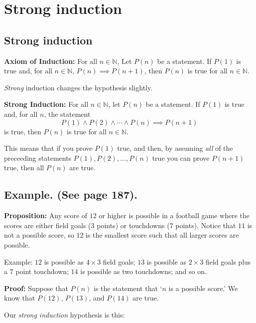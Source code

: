 \documentclass[
]{article}
\author{}
\date{}
\begin{document}
\hypertarget{strong-induction}{%
\section{Strong induction}\label{strong-induction}}

\hypertarget{strong-induction-1}{%
\subsection{Strong induction}\label{strong-induction-1}}

\textbf{Axiom of Induction:} For all \(n\in \mathbb{N}\), Let \(P(n)\)
be a statement. If \(P(1)\) is true and, for all \(n\in\mathbb{N}\),
\(P(n)\implies P(n+1)\), then \(P(n)\) is true for all
\(n\in\mathbb{N}\).

\emph{Strong} induction changes the hypothesis slightly.

\textbf{Strong Induction:} For all \(n\in\mathbb{N}\), let \(P(n)\) be a
statement. If \(P(1)\) is true and, for all \(n\), the statement \[
P(1)\wedge P(2)\wedge\cdots\wedge P(n)\implies P(n+1)
\] is true, then \(P(n)\) is true for all \(n\in\mathbb{N}\).

This means that if you prove \(P(1)\) true, and then, by assuming
\emph{all} of the preceeding statements \(P(1),P(2),\ldots, P(n)\) true
you can prove \(P(n+1)\) true, then all \(P(n)\) are true.

\vfill\eject

\hypertarget{example.-see-page-187.}{%
\subsection{Example. (See page 187).}\label{example.-see-page-187.}}

\textbf{Proposition:} Any score of \(12\) or higher is possible in a
football game where the scores are either field goals (\(3\) points) or
touchdowns (\(7\) points). Notice that \(11\) is not a possible score,
so \(12\) is the smallest score such that all larger scores are
possible.

Example: \(12\) is possible as \(4\times 3\) field goals; \(13\) is
possible as \(2\times 3\) field goals plus a \(7\) point touchdown;
\(14\) is possible as two touchdowns; and so on.

\textbf{Proof:} Suppose that \(P(n)\) is the statement that `\(n\) is a
possible score.' We know that \(P(12)\), \(P(13)\), and \(P(14)\) are
true.

Our \emph{strong induction} hypothesis is this:
\end{document}
